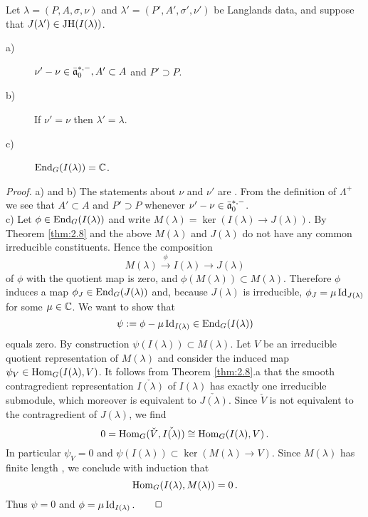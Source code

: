 \begin{lem}\label{lem:2.9}
Let $\lambda = (P,A,\sigma,\nu)$ and $\lambda' = (P',A',\sigma',\nu')$ be Langlands data,
and suppose that $J(\lambda' ) \in \mathrm{JH}(I(\lambda ))$.
\begin{description}
\item[a)] $\nu' - \nu \in \bar{\mathfrak a}_0^{*,-} , A' \subset A$ and $P' \supset P$.
\item[b)] If $\nu' = \nu$ then $\lambda' = \lambda$.
\item[c)] $\mathrm{End}_G (I(\lambda )) = \mathbb C$.
\end{description}
\end{lem}
\emph{Proof.} a) and b) The statements about $\nu$ and $\nu'$ are 
\cite[Lemma XI.2.13]{BoWa}. From the definition of $\Lambda^+$ we see that $A' \subset A$ 
and $P' \supset P$ whenever $\nu' - \nu \in \bar{\mathfrak a}_0^{*,-}$.\\
c) Let $\phi \in \mathrm{End}_G (I(\lambda ))$ and write $M(\lambda ) = \ker (I (\lambda) \to 
J (\lambda ))$. By Theorem \ref{thm:2.8} and the above $M(\lambda)$ and $J(\lambda )$ 
do not have any common irreducible constituents. Hence the composition 
\[
M (\lambda) \xrightarrow{\phi} I(\lambda ) \to J(\lambda )
\]
of $\phi$ with the quotient map is zero, and $\phi (M(\lambda )) \subset M(\lambda)$. 
Therefore $\phi$ induces a map $\phi_J \in \mathrm{End}_G (J (\lambda))$ and, because 
$J(\lambda )$ is irreducible, $\phi_J = \mu \, \mathrm{Id}_{J(\lambda )}$ for some 
$\mu \in \mathbb C$. We want to show that
\[
\psi := \phi - \mu \, \mathrm{Id}_{I(\lambda )} \in \mathrm{End}_G (I(\lambda ))
\]
equals zero. By construction $\psi (I(\lambda )) \subset M (\lambda )$. Let $V$ be an 
irreducible quotient representation of $M(\lambda )$ and consider the induced map 
$\psi_V \in \mathrm{Hom}_G (I(\lambda ),V)$. It follows from Theorem \ref{thm:2.8}.a that 
the smooth contragredient representation $\check{I (\lambda )}$ of $I(\lambda )$ has 
exactly one irreducible submodule, which moreover is equivalent to $\check{J(\lambda )}$. 
Since $\check V$ is not equivalent to the contragredient of $J(\lambda )$, we find
\[
0 = \mathrm{Hom}_G (\check V , \check{I (\lambda )}) \cong \mathrm{Hom}_G (I (\lambda ),V) \,.
\]
In particular $\psi_V = 0$ and $\psi (I(\lambda)) \subset \ker (M(\lambda) \to V)$. 
Since $M(\lambda )$ has finite length \cite[p. 30]{BeDe}, we conclude with induction that 
\begin{equation}\label{eq:2.19}
\mathrm{Hom}_G (I(\lambda ),M(\lambda )) = 0 \,.
\end{equation}
Thus $\psi = 0$ and $\phi = \mu \, \mathrm{Id}_{I(\lambda )} \,. \qquad \Box$
\\[2mm]

